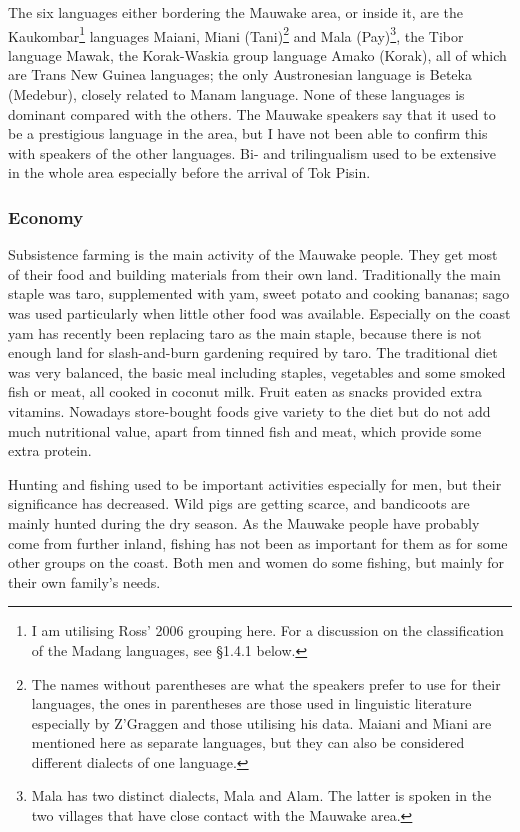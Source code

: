 The six languages either bordering the Mauwake area, or inside it, are the Kaukombar\footnote{I am utilising Ross' 2006 grouping here. For a discussion on the classification of the Madang languages, see {\S}1.4.1 below.} languages Maiani, Miani (Tani)\footnote{The names without parentheses are what the speakers prefer to use for their languages, the ones in parentheses are those used in linguistic literature especially by Z'Graggen and those utilising his data. Maiani and Miani are mentioned here as separate languages, but they can also be considered different dialects of one language.}  and Mala (Pay)\footnote{Mala has two distinct dialects, Mala and Alam. The latter is spoken in the two villages that have close contact with the Mauwake area.}, the Tibor language Mawak, the Korak-Waskia group language Amako (Korak), all of which are Trans New Guinea languages; the only Austronesian language is Beteka (Medebur), closely related to Manam language. None of these languages is dominant compared with the others.  The Mauwake speakers say that it used to be a prestigious language in the area, but I have not been able to confirm this with speakers of the other languages. Bi- and trilingualism used to be extensive in the whole area especially before the arrival of Tok Pisin. 

\subsubsection{Economy}
\hypertarget{RefHeading18501935131865}{}Subsistence farming is the main activity of the Mauwake people. They get most of their food and building materials from their own land.  Traditionally the main staple was taro, supplemented with yam, sweet potato and cooking bananas; sago was used particularly when little other food was available. Especially on the coast yam has recently been replacing taro as the main staple, because there is not enough land for slash-and-burn gardening required by taro. The traditional diet was very balanced, the basic meal including staples, vegetables and some smoked fish or meat, all cooked in coconut milk. Fruit eaten as snacks provided extra vitamins. Nowadays store-bought foods give variety to the diet but do not add much nutritional value, apart from tinned fish and meat, which provide some extra protein.

Hunting and fishing used to be important activities especially for men, but their significance has decreased. Wild pigs are getting scarce, and bandicoots are mainly hunted during the dry season.  As the Mauwake people have probably come from further inland, fishing has not been as important for them as for some other groups on the coast.  Both men and women do some fishing, but mainly for their own family's needs. 


